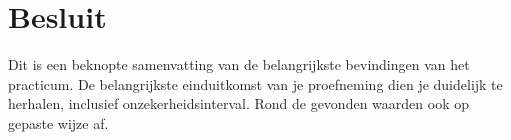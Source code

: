 \section{Besluit}
Dit is een beknopte samenvatting van de belangrijkste bevindingen van het practicum. 
De belangrijkste einduitkomst van je proefneming dien je duidelijk te herhalen, inclusief
onzekerheidsinterval. 
Rond de gevonden waarden ook op gepaste wijze af.